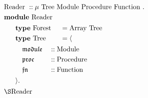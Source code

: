 \documentclass[12pt, preview]{standalone}
\begin{document}
\begin{math}
\begin{aligned}
  \ & \mathrm{Reader\ } :: \mu \mathrm{\ Tree\ } \mathrm{Module\ } \mathrm{Procedure\ } \mathrm{Function\ } \mathbf{.}  \\
    & \mathbf{module\ } \mathrm{Reader}  \\
    & \ 
  \begin{aligned}
    \quad & \ 
      \begin{aligned}
        & \mathbf{type\ } \mathrm{Forest\ } & & = \mathrm{Array\ } \mathrm{Tree\ } \\
        & \mathbf{type\ } \mathrm{Tree\ } & & = \langle \\
      \end{aligned} \\
          & \quad \ 
    \begin{aligned}
      & \mathfrak{module} & & :: \mathrm{Module} \\
      & \mathfrak{proc}   & & :: \mathrm{Procedure} \\
      & \mathfrak{fn}     & & :: \mathrm{Function} \\
    \end{aligned} \\
          & \  \rangle \mathbf{.} \\
  \end{aligned} \\
  & \mathbf{\S}\mathrm{Reader}
\end{aligned}
\end{math}
\end{document}
